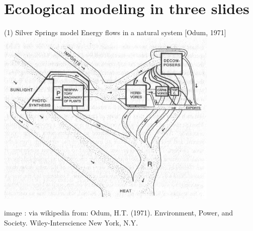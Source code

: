 \documentclass[11,aspectratio=1610]{beamer}
\begin{document}
\section{Ecological modeling in three slides}




\begin{frame}{(1) Silver Springs model  }
Energy flows in a natural system [Odum,  1971]
\includegraphics[width=0.8\textwidth]{img/Silver_Spring_Model.jpeg} 

\tiny{image  : via wikipedia from:  Odum, H.T. (1971). Environment, Power, and Society. Wiley-Interscience New York, N.Y.}
\end{frame}
\end{document}

